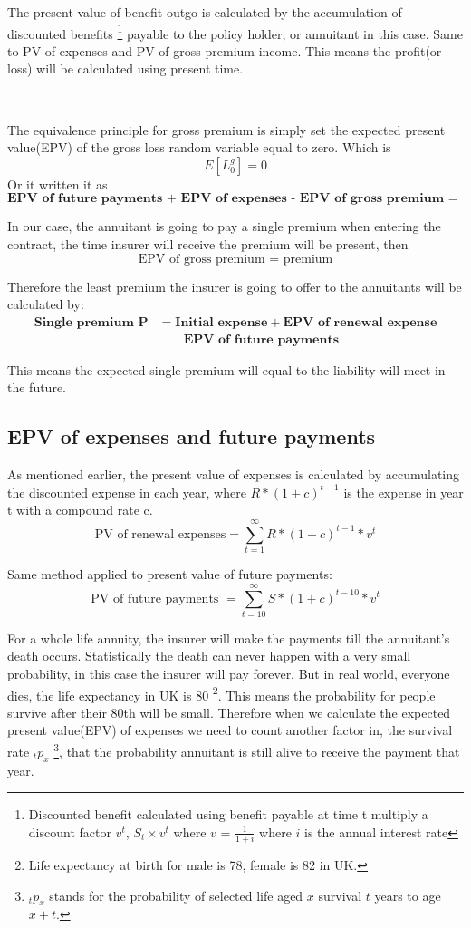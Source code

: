\documentclass{report}
\begin{document}
The present value of benefit outgo is calculated by the accumulation of discounted benefits \footnote{Discounted benefit calculated using benefit payable at time t multiply a discount factor $v^t$, $S_t \times v^t$ where $v$ = $\frac{1}{1+i}$ where $i$ is the annual interest rate} payable to the policy holder, or annuitant in this case. Same to PV of expenses and PV of gross premium income. This means the profit(or loss) will be calculated using present time.

 \



The equivalence principle for gross premium is simply set the expected present value(EPV) of the gross loss random variable equal to zero. Which is
\[
E[L_0^g] = 0
\]
Or it written it as
\[
\textbf{EPV\ of\ future\ payments + EPV\ of\ expenses - EPV\ of\ gross\ premium = 0}
\]

In our case, the annuitant is going to pay a single premium when entering the contract, the time insurer will receive the premium will be present, then 
\[
\text{EPV of gross premium = premium}
\]

Therefore the least premium the insurer is going to offer to the annuitants will be calculated by:
\begin{align}
\textbf{Single premium P} &= \textbf{Initial expense} + \textbf{EPV of renewal expense}  \nonumber \\
 &\qquad {} \textbf{EPV of future payments}
\end{align}


This means the expected single premium will equal to the liability will meet in the future.




\subsection{EPV of expenses and future payments}

As mentioned earlier, the present value of expenses is calculated by accumulating the discounted expense in each year, where  $R *(1 + c )^{t-1}$ is the expense in year t with a compound rate c.
\[
\text{PV of renewal expenses} = \sum_{t=1}^{\infty} R *(1 + c )^{t-1} *v^t
\]

Same method applied to present value of future payments:
\[
\text{PV of future payments }= \sum_{t=10}^{\infty} S * (1 + c )^{t-10} * v^t 
\]

For a whole life annuity, the insurer will make the payments till the annuitant's death occurs. Statistically the death can never happen with a very small probability, in this case the insurer will pay forever. But in real world, everyone dies, the life expectancy in UK is 80 \footnote{Life expectancy at birth for male is 78, female is 82 in UK.}. This means the probability for people survive after their 80th will be small. Therefore when we calculate the expected present value(EPV) of expenses we need to count another factor in, the survival rate $_tp_x$ \footnote{$_tp_x$ stands for the probability of selected life aged $x$ survival $t$ years to age $x+t$.}, that the probability annuitant is still alive to receive the payment that year.
\end{document}
